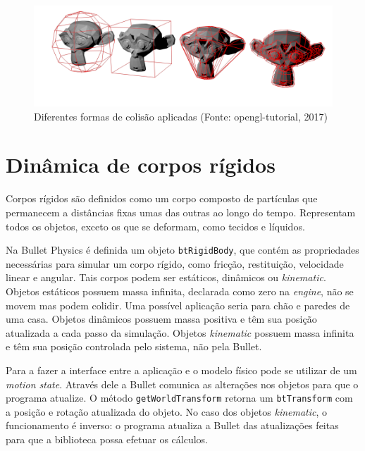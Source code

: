 \begin{figure}[H]
	\centering
	\includegraphics[scale=0.4]{imagens/collision-shapes.png}
	\caption[Diferentes formas de colisão aplicadas]{Diferentes formas de colisão aplicadas (Fonte: opengl-tutorial, 2017)}
	\label{fig:collisionshapes}
\end{figure}

\section{Dinâmica de corpos rígidos}
Corpos rígidos são definidos como um corpo composto de partículas que permanecem a distâncias fixas umas das outras ao longo do tempo. Representam todos os objetos, exceto os que se deformam, como tecidos e líquidos.

Na Bullet Physics é definida um objeto \lstinline{btRigidBody}, que contém as propriedades necessárias para simular um corpo rígido, como fricção, restituição, velocidade linear e angular. Tais corpos podem ser estáticos, dinâmicos ou \textit{kinematic}. Objetos estáticos possuem massa infinita, declarada como zero na \textit{engine}, não se movem mas podem colidir. Uma possível aplicação seria para chão e paredes de uma casa. Objetos dinâmicos possuem massa positiva e têm sua posição atualizada a cada passo da simulação. Objetos \textit{kinematic} possuem massa infinita e têm sua posição controlada pelo sistema, não pela Bullet.

Para a fazer a interface entre a aplicação e o modelo físico pode se utilizar de um \textit{motion state}. Através dele a Bullet comunica as alterações nos objetos para que o programa atualize. O método \lstinline{getWorldTransform} retorna um \lstinline{btTransform} com a posição e rotação atualizada do objeto. No caso dos objetos \textit{kinematic}, o funcionamento é inverso: o programa atualiza a Bullet das atualizações feitas para que a biblioteca possa efetuar os cálculos. 